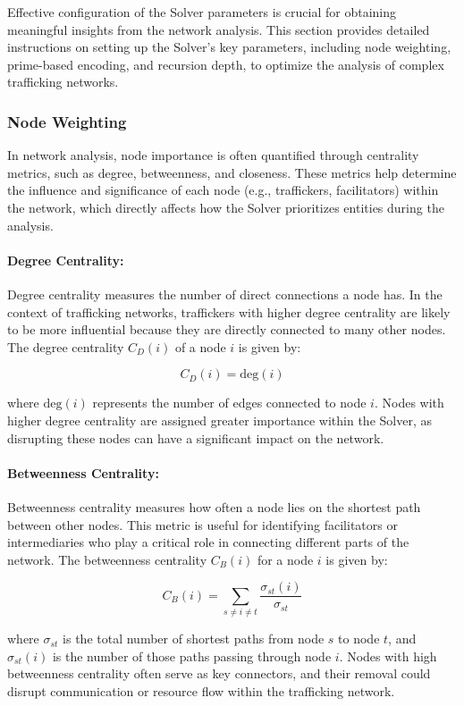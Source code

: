 \documentclass[%
 preprint, linenumbers,
 amsmath,amssymb,
 aps, physrev,
]{revtex4-2}
\begin{document}
Effective configuration of the Solver parameters is crucial for obtaining meaningful insights from the network analysis. This section provides detailed instructions on setting up the Solver’s key parameters, including node weighting, prime-based encoding, and recursion depth, to optimize the analysis of complex trafficking networks.

\subsubsection{Node Weighting}

In network analysis, node importance is often quantified through centrality metrics, such as degree, betweenness, and closeness. These metrics help determine the influence and significance of each node (e.g., traffickers, facilitators) within the network, which directly affects how the Solver prioritizes entities during the analysis.

\paragraph{Degree Centrality:}
Degree centrality measures the number of direct connections a node has. In the context of trafficking networks, traffickers with higher degree centrality are likely to be more influential because they are directly connected to many other nodes. The degree centrality \(C_D(i)\) of a node \(i\) is given by:

\[
C_D(i) = \text{deg}(i)
\]

where \(\text{deg}(i)\) represents the number of edges connected to node \(i\). Nodes with higher degree centrality are assigned greater importance within the Solver, as disrupting these nodes can have a significant impact on the network.

\paragraph{Betweenness Centrality:}
Betweenness centrality measures how often a node lies on the shortest path between other nodes. This metric is useful for identifying facilitators or intermediaries who play a critical role in connecting different parts of the network. The betweenness centrality \(C_B(i)\) for a node \(i\) is given by:

\[
C_B(i) = \sum_{s \neq i \neq t} \frac{\sigma_{st}(i)}{\sigma_{st}}
\]

where \(\sigma_{st}\) is the total number of shortest paths from node \(s\) to node \(t\), and \(\sigma_{st}(i)\) is the number of those paths passing through node \(i\). Nodes with high betweenness centrality often serve as key connectors, and their removal could disrupt communication or resource flow within the trafficking network.
\end{document}
